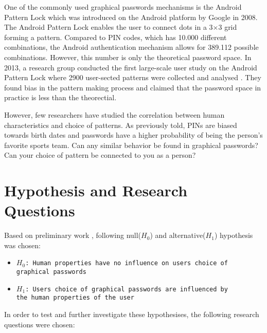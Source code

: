    One of the commonly used graphical passwords mechanisms is the Android Pattern Lock which was introduced on the Android platform by Google in 2008. The Android Pattern Lock enables the user to connect dots in a 3$\times$3 grid forming a pattern. Compared to PIN codes, which has 10.000 different combinations, the Android authentication mechanism allows for 389.112 possible combinations. However, this number is only the theoretical password space. In 2013, a research group conducted the first large-scale user study on the Android Pattern Lock where 2900 user-sected patterns were collected and analysed \cite{Uellenbeck}. They found bias in the pattern making process and claimed that the password space in practice is less than the theorectial.

    However, few researchers have studied the correlation between human characteristics and choice of patterns. As previously told, PINs are biased towards birth dates and passwords have a higher probability of being the person's favorite sports team. Can any similar behavior be found in graphical passwords? Can your choice of pattern be connected to you as a person?

	\section{Hypothesis and Research Questions}\label{sec:hypothesis}
    Based on preliminary work \cite{prosjektoppgave}, following null($H_0$) and alternative($H_1$) hypothesis was chosen:
		{\renewcommand\labelitemi{}
			\begin{itemize}
	  		\item \texttt{$H_{0}$: Human properties have no influence on users choice of \\graphical passwords}
	  		\item \texttt{$H_{1}$: Users choice of graphical passwords are influenced by \\the human properties of the user}
	  	\end{itemize}
	  }
    
    In order to test and further investigate these hypothesises, the following research questions were chosen:


